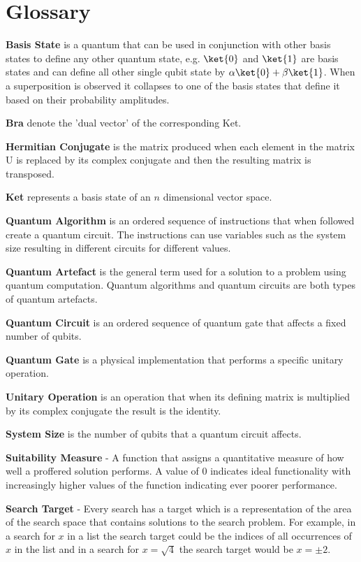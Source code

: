 \chapter{Glossary}

\noindent\textbf{Basis State} is a quantum that can be used in conjunction with other basis states to define any other quantum state, e.g. $\ket{0}$ and $\ket{1}$ are basis states and can define all other single qubit state by $\alpha\ket{0}+\beta\ket{1}$. When a superposition is observed it collapses to one of the basis states that define it based on their probability amplitudes.

\noindent\textbf{Bra} denote the 'dual vector' of the corresponding Ket.

\noindent\textbf{Hermitian Conjugate} is the matrix produced when each element in the matrix U is replaced by its complex conjugate and then the resulting matrix is transposed.

\noindent\textbf{Ket} represents a basis state of an $n$ dimensional vector space.

\noindent\textbf{Quantum Algorithm} is an ordered sequence of instructions that when followed create a quantum circuit.
The instructions can use variables such as the system size resulting in different circuits for different values.

\noindent\textbf{Quantum Artefact} is the general term used for a solution to a problem using quantum computation.
Quantum algorithms and quantum circuits are both types of quantum artefacts.

\noindent\textbf{Quantum Circuit} is an ordered sequence of quantum gate that affects a fixed number of qubits.

\noindent\textbf{Quantum Gate} is a physical implementation that performs a specific unitary operation.

\noindent\textbf{Unitary Operation} is an operation that when its defining matrix is multiplied by its complex conjugate the result is the identity.

\noindent\textbf{System Size} is the number of qubits that a quantum circuit affects.



\noindent\textbf{Suitability Measure} - A function that assigns a quantitative measure of how well a proffered solution performs.
A value of $0$ indicates ideal functionality with increasingly higher values of the function indicating ever poorer performance.

\noindent\textbf{Search Target} - Every search has a target which is a representation of the area of the search space that contains solutions to the search problem.
For example, in a search for $x$ in a list the search target could be the indices of all occurrences of $x$ in the list and in a search for $x=\sqrt{4}$ the search target would be $x=\pm2$.